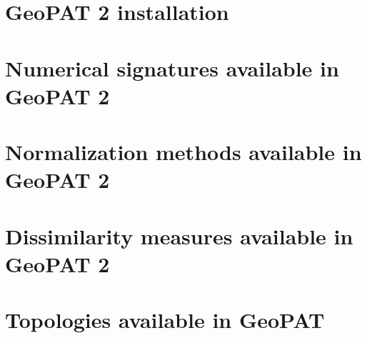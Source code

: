 \documentclass[a4paper, 11pt]{book}
\begin{document}
\FloatBarrier

\begin{appendices}

\chapter{GeoPAT 2 installation}


\chapter{Numerical signatures available in GeoPAT 2 \label{signatures}} 


\chapter{Normalization methods available in GeoPAT 2 \label{normalization}} 


\chapter{Dissimilarity measures available in GeoPAT 2 \label{measures}}


\chapter{Topologies available in GeoPAT \label{topology}}


\end{appendices}

\newpage

\printbibliography[heading=bibintoc,title={References}]
\end{document}
